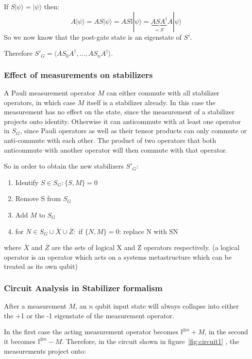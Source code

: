If $S|\psi\rangle = |\psi\rangle$ then:
\begin{equation}
A|\psi\rangle = AS|\psi\rangle = AS\mathbb{I}|\psi\rangle
	= \underbrace{ASA^{\dagger}}_{=S'}A|\psi\rangle
\end{equation}
So we now know that the post-gate state is an eigenstate of $S'$.

Therefore $S'_{G} = \langle AS_{0}A^{\dagger},...,AS_{n}A^{\dagger}\rangle$.


\subsubsection{Effect of measurements on stabilizers}
A Pauli measurement operator $M$ can either commute with all stabilizer
operators, in which case $M$ itself is a stabilizer already. In this case
the measurement has no effect on the state, since the measurement of a
stabilizer projects onto identity.
Otherwise it can anticommute with at
least one operator in $S_{G}$, since Pauli operators as well as
their tensor products can only commute or anti-commute with each
other. The product of two operators that both anticommute with another operator
will then commute with that operator.

So in order to obtain the new stabilizers  $S'_{G}$:
\begin{enumerate}
	\item Identify $S\in S_{G}: \{S,M\}=0$
	\item Remove S from $S_G$
	\item Add $M$ to $S_G$ 
	\item for $N \in S_G \cup\overline{X}\cup\overline{Z}:$
		if $\{N,M\}=0$: replace N with SN
\end{enumerate}
where $\overline{X}$ and $\overline{Z}$ are the sets of 
logical X and Z operators respectively. (a logical operator is
an operator which acts on a systems metastructure which can be treated
as its own qubit)

\subsubsection{Circuit Analysis in Stabilizer formalism}
After a measurement $M$, an $n$ qubit input state will always 
collapse into either the +1 or the -1 eigenstate of the 
measurement operator.

In the first case the acting measurement operator becomes 
$\mathbb{I}^{\otimes n}+M$, in the second it becomes
$\mathbb{I}^{\otimes n}-M$. Therefore, in the circuit shown in 
figure~\ref{fig:circuit1}
, the measurements project onto:

